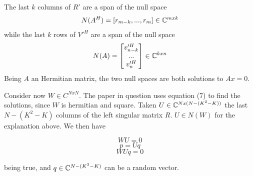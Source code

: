 The last $k$ columns of $R'$ are a span of the null space
\begin{equation}
  N(A^H) = [r_{m-k}, ..., r_m ] \in \mathbb{C}^{mxk}
\end{equation}
while the last $k$ rows of $V'^H$ are a span of the null space
\begin{equation}
  N(A) = \begin{bmatrix} v'^H_{n-k} \\ ... \\ v'^H_n \end{bmatrix} \in \mathbb{C}^{kxn}
\end{equation}
Being $A$ an Hermitian matrix, the two null spaces are both solutions to $Ax = 0$.

Consider now $W \in C^{NxN}$. The paper in question uses equation (7) to find the solutions, since $W$ is hermitian and square. Taken $U \in \mathbb{C} ^ {Nx(N-(K^2 - K))}$ the last $N-(K^2 - K)$ columns of the left singular matrix $R$. $U \in N(W)$ for the explanation above. We then have

\begin{equation}WU = 0\end{equation}
\begin{equation}p = Uq\end{equation}
\begin{equation}WUq = 0\end{equation}

being true, and $q \in \mathbb{C}^{N-(K^2 - K)}$ can be a random vector.
